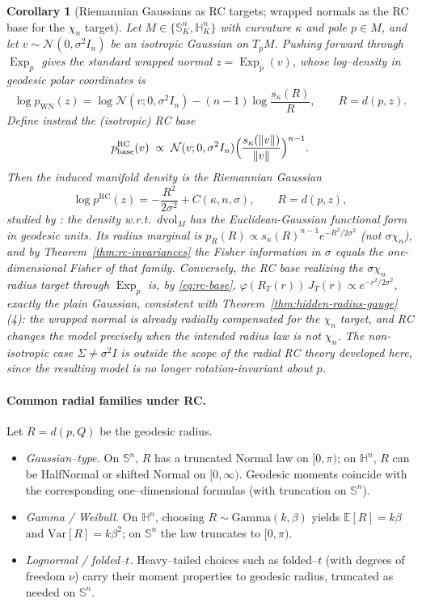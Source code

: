 \documentclass{article}
\newtheorem{corollary}{Corollary}
\theoremstyle{definition}
\theoremstyle{remark}
\newcommand{\vol}{\mathrm{vol}}
\newcommand{\SSS}{\mathbb{S}}
\newcommand{\HH}{\mathbb{H}}
\newcommand{\Exp}{\operatorname{Exp}}
\begin{document}
\begin{corollary}[Riemannian Gaussians as RC targets; wrapped normals as the RC base for the $\chi_n$ target]
Let $M\in\{\SSS^n_K,\HH^n_K\}$ with curvature $\kappa$ and pole $p\in M$, and let
$v\sim\mathcal N(0,\sigma^2 I_n)$ be an isotropic Gaussian on $T_pM$. Pushing
forward through $\Exp_p$ gives the standard wrapped normal $z=\Exp_p(v)$, whose
log--density in geodesic polar coordinates is
\[
\log p_{\mathrm{WN}}(z)
=
\log\mathcal N(v;0,\sigma^2 I_n)
-(n-1)\log\frac{s_\kappa(R)}{R},
\qquad R=d(p,z).
\]
Define instead the (isotropic) RC base
\[
p^{\mathrm{RC}}_{\mathrm{base}}(v)
\;\propto\;
\mathcal N(v;0,\sigma^2 I_n)
\Bigl(\frac{s_\kappa(\|v\|)}{\|v\|}\Bigr)^{n-1}.
\]
Then the induced manifold density is the \emph{Riemannian Gaussian}
\[
\log p^{\mathrm{RC}}(z)=-\frac{R^2}{2\sigma^2}+C(\kappa,n,\sigma),\qquad R=d(p,z),
\]
studied by \citet{pennec2006intrinsic,said2017riemannian}: the density w.r.t.\ $d\vol_M$ has the
Euclidean-Gaussian functional form \emph{in geodesic units}. Its radius marginal is
$p_R(R)\propto s_\kappa(R)^{n-1}e^{-R^2/2\sigma^2}$ (not $\sigma\chi_n$), and by
Theorem~\ref{thm:rc-invariances} the Fisher information in $\sigma$ equals the one-dimensional
Fisher of \emph{that} family. Conversely, the RC base realizing the $\sigma\chi_n$ radius target
through $\Exp_p$ is, by \eqref{eq:rc-base},
$\varphi(R_T(r))\,J_T(r)\propto e^{-r^2/2\sigma^2}$, exactly the plain Gaussian, consistent with
Theorem~\ref{thm:hidden-radius-gauge}(4): the wrapped normal is already radially compensated for the
$\chi_n$ target, and RC changes the model precisely when the intended radius law is \emph{not} $\chi_n$. The non-isotropic case $\Sigma\neq\sigma^2 I$ is outside
the scope of the radial RC theory developed here, since the resulting model is
no longer rotation-invariant about $p$.
\end{corollary}

\paragraph{Common radial families under RC.}
Let $R=d(p,Q)$ be the geodesic radius.

\begin{itemize}
\item \emph{Gaussian--type.}
On $\SSS^n$, $R$ has a truncated Normal law on $[0,\pi)$; on $\HH^n$, $R$ can be
HalfNormal or shifted Normal on $[0,\infty)$.
Geodesic moments coincide with the corresponding one--dimensional formulas (with truncation
on $\SSS^n$).

\item \emph{Gamma / Weibull.}
On $\HH^n$, choosing $R\sim\mathrm{Gamma}(k,\beta)$ yields
$\mathbb E[R]=k\beta$ and $\mathrm{Var}[R]=k\beta^2$; on $\SSS^n$ the law truncates to
$[0,\pi)$.

\item \emph{Lognormal / folded--$t$.}
Heavy--tailed choices such as folded--$t$ (with degrees of freedom $\nu$) carry their moment
properties to geodesic radius, truncated as needed on $\SSS^n$.
\end{itemize}
\end{document}
